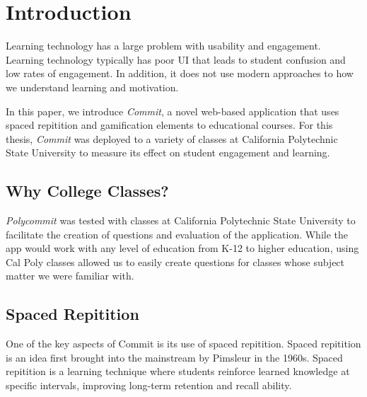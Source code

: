 
\section{Introduction}
\par Learning technology has a large problem with usability and engagement. Learning technology typically has poor UI that leads to student confusion and low rates of engagement. In addition, it does not use modern approaches to how we understand learning and motivation.

\par In this paper, we introduce \textit{Commit}, a novel web-based application that uses spaced repitition and gamification elements to educational courses. For this thesis, \textit{Commit} was deployed to a variety of classes at California Polytechnic State University to measure its effect on student engagement and learning.

\subsection{Why College Classes?}
\par \textit{Polycommit} was tested with classes at California Polytechnic State University to facilitate the creation of questions and evaluation of the application. While the app would work with any level of education from K-12 to higher education, using Cal Poly classes allowed us to easily create questions for classes whose subject matter we were familiar with.


\subsection{Spaced Repitition}
\par One of the key aspects of Commit is its use of spaced repitition. Spaced repitition is an idea first brought into the mainstream by Pimsleur in the 1960s. Spaced repitition is a learning technique where students reinforce learned knowledge at specific intervals, improving long-term retention and recall ability.

